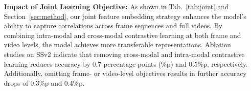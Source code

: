 \begin{table}[h!]
\centering
{}
\vspace{-5pt}
\caption{Impact of different masking ratios on the image and video branches for action classification accuracy.}
\label{tab:ratios}
\vspace{-10pt}
\end{table}



\noindent\textbf{Impact of Joint Learning Objective:}
As shown in Tab.~\ref{tab:joint} and Section~\ref{sec:method}, our joint feature embedding strategy enhances the model's ability to capture correlations across frame sequences and full videos. By combining intra-modal and cross-modal contrastive learning at both frame and video levels, the model achieves more transferable representations. Ablation studies on SSv2 indicate that removing cross-modal and intra-modal contrastive learning reduces accuracy by 0.7 percentage points (\%p) and 0.5\%p, respectively. Additionally, omitting frame- or video-level objectives results in further accuracy drops of 0.3\%p and 0.4\%p.

